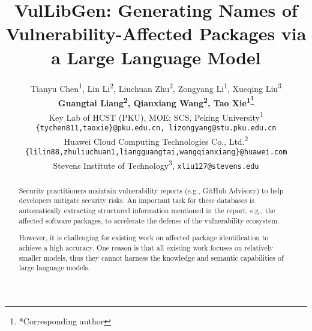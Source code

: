 \documentclass[11pt,dvipsnames]{article}
\title{VulLibGen: Generating Names of Vulnerability-Affected Packages via a Large Language Model}
\author{
  Tianyu Chen\textsuperscript{1}, Lin Li\textsuperscript{2}, Liuchuan Zhu\textsuperscript{2}, Zongyang Li\textsuperscript{1}, Xueqing Liu\textsuperscript{3}\\
  \textbf{Guangtai Liang\textsuperscript{2}, Qianxiang Wang\textsuperscript{2}, Tao Xie\textsuperscript{1\thanks{*Corresponding author}
}} \\
  Key Lab of HCST (PKU), MOE; SCS, Peking University\textsuperscript{1}\\
  \texttt{\{tychen811,taoxie\}@pku.edu.cn, lizongyang@stu.pku.edu.cn} \\
  Huawei Cloud Computing Technologies Co., Ltd.\textsuperscript{2} \\
  \texttt{\{lilin88,zhuliuchuan1,liangguangtai,wangqianxiang\}@huawei.com} \\
  Stevens Institute of Technology\textsuperscript{3}, \texttt{xliu127@stevens.edu}\\
}
\newcommand{\xueqing}[1]{\textcolor{red}{Xueqing (TBD): #1}}
\begin{document}
\maketitle
\begin{abstract}

Security practitioners maintain vulnerability reports (e.g., GitHub Advisory) to help developers mitigate security risks. An important task for these databases is automatically extracting structured information mentioned in the report, e.g., the affected software packages, to accelerate the defense of the vulnerability ecosystem. 


However, it is challenging for existing work on affected package identification to achieve a high accuracy. One reason is that all existing work focuses on relatively smaller models, thus they cannot harness the knowledge and semantic capabilities of large language models. 



\end{abstract}
\end{document}
